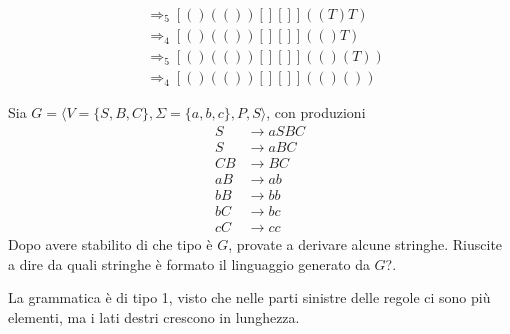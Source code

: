 \documentclass[12pt, answers]{exam}
\newcommand{\der}{\Rightarrow}
\begin{document}
\begin{questions}
\begin{parts}
\begin{solution}
\begin{align*}
				  &\der_5 [ () (()) [] [] ] ((T) T) \\
				  &\der_4 [ () (()) [] [] ] (() T) \\
				  &\der_5 [ () (()) [] [] ] (() (T)) \\
				  &\der_4 [ () (()) [] [] ] (() ())
			\end{align*}
		\end{solution}
	\end{parts}
	\question Sia $G = \langle V = \{ S, B, C\}, \Sigma = \{ a , b, c\}, P, S\rangle$, con produzioni
	\begin{align*}
		S &\rightarrow a S B C \\
		S &\rightarrow a B C \\
		C B &\rightarrow B C \\
		a B &\rightarrow a b \\
		b B &\rightarrow b b \\
		b C &\rightarrow b c \\
		c C &\rightarrow cc
	\end{align*}
	Dopo avere stabilito di che tipo è $G$, provate a derivare alcune stringhe. Riuscite a dire da quali stringhe è formato il linguaggio generato da $G$?.
	\begin{solution}
		La grammatica è di tipo 1, visto che nelle parti sinistre delle regole ci sono più elementi, ma i lati destri crescono in lunghezza.


\end{solution}
\end{questions}
\end{document}
